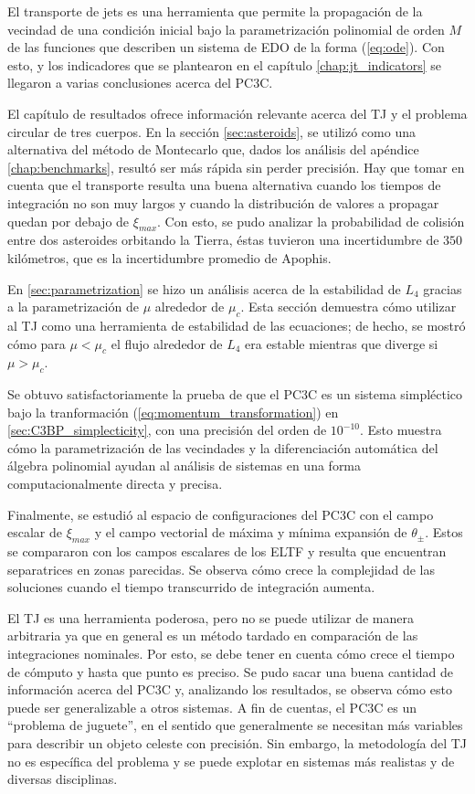 El transporte de jets es una herramienta que permite la propagación de la vecindad de una condición inicial bajo la parametrización polinomial de orden $M$ de las funciones que describen un sistema de EDO de la forma (\ref{eq:ode}). Con esto, y los indicadores que se plantearon en el capítulo \ref{chap:jt_indicators} se llegaron a varias conclusiones acerca del PC3C.

El capítulo de resultados ofrece información relevante acerca del TJ y el problema circular de tres cuerpos. En la sección \ref{sec:asteroids}, se utilizó como una alternativa del método de Montecarlo que, dados los análisis del apéndice \ref{chap:benchmarks}, resultó ser más rápida sin perder precisión. Hay que tomar en cuenta que el transporte resulta una buena alternativa cuando los tiempos de integración no son muy largos y cuando la distribución de valores a propagar quedan por debajo de $\xi_{max}$. Con esto, se pudo analizar la probabilidad de colisión entre dos asteroides orbitando la Tierra, éstas tuvieron una incertidumbre de $350$ kilómetros, que es la incertidumbre promedio de Apophis. 

En \ref{sec:parametrization} se hizo un análisis acerca de la estabilidad de $L_4$ gracias a la parametrización de $\mu$ alrededor de $\mu_c$. Esta sección demuestra cómo utilizar al TJ como una herramienta de estabilidad de las ecuaciones; de hecho, se mostró cómo para $\mu < \mu_c$ el flujo alrededor de $L_4$ era estable mientras que diverge si $\mu > \mu_c$. 

Se obtuvo satisfactoriamente la prueba de que el PC3C es un sistema simpléctico bajo la tranformación (\ref{eq:momentum_transformation}) en \ref{sec:C3BP_simplecticity}, con una precisión del orden de $10^{-10}$. Esto muestra cómo la parametrización de las vecindades y la diferenciación automática del álgebra polinomial ayudan al análisis de sistemas en una forma computacionalmente directa y precisa. 

Finalmente, se estudió al espacio de configuraciones del PC3C con el campo escalar de $\xi_{max}$ y el campo vectorial de máxima y mínima expansión de $\theta_{\pm}$. Estos se compararon con los campos escalares de los ELTF y resulta que encuentran separatrices en zonas parecidas. Se observa cómo crece la complejidad de las soluciones cuando el tiempo transcurrido de integración aumenta.

El TJ es una herramienta poderosa, pero no se puede utilizar de manera arbitraria ya que en general es un método tardado en comparación de las integraciones nominales. Por esto, se debe tener en cuenta cómo crece el tiempo de cómputo y hasta que punto es preciso. Se pudo sacar una buena cantidad de información acerca del PC3C y, analizando los resultados, se observa cómo esto puede ser generalizable a otros sistemas. A fin de cuentas, el PC3C es un ``problema de juguete'', en el sentido que generalmente se necesitan más variables para describir un objeto celeste con precisión. Sin embargo, la metodología del TJ no es específica del problema y se puede explotar en sistemas más realistas y de diversas disciplinas. 


